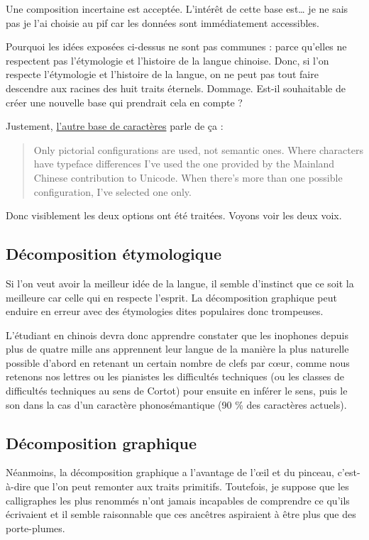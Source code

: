 \documentclass[12pt,onecolumn]{article} %
\begin{document}
Une composition incertaine est acceptée. L'intérêt de cette base est… je ne sais pas je l'ai choisie au pif car les données sont immédiatement accessibles.

Pourquoi les idées exposées ci-dessus ne sont pas communes : parce qu'elles ne respectent pas l'étymologie et l'histoire de la langue chinoise. Donc, si l'on respecte l'étymologie et l'histoire de la langue, on ne peut pas tout faire descendre aux racines des huit traits éternels. Dommage. Est-il souhaitable de créer une nouvelle base qui prendrait cela en compte ?

Justement, \href{http://cjkdecomp.codeplex.com/wikipage?title=cjk-decomp&referringTitle=Home}{l'autre base de caractères} parle de ça : \begin{quotation}Only pictorial configurations are used, not semantic ones. Where characters have typeface differences I've used the one provided by the Mainland Chinese contribution to Unicode. When there's more than one possible configuration, I've selected one only.
\end{quotation}
Donc visiblement les deux options ont été traitées. Voyons voir les deux voix.

\subsection{Décomposition étymologique}

Si l'on veut avoir la meilleur idée de la langue, il semble d'instinct que ce soit la meilleure car celle qui en respecte l'esprit. La décomposition graphique peut enduire en erreur avec des étymologies dites populaires donc trompeuses.

L'étudiant en chinois devra donc apprendre constater que les inophones depuis plus de quatre mille ans apprennent leur langue de la manière la plus naturelle possible d'abord en retenant un certain nombre de clefs par cœur, comme nous retenons nos lettres ou les pianistes les difficultés techniques (ou les classes de difficultés techniques au sens de Cortot) pour ensuite en inférer le sens, puis le son dans la cas d'un caractère phonosémantique (90 \% des caractères actuels).

\subsection{Décomposition graphique}

Néanmoins, la décomposition graphique a l'avantage de l'œil et du pinceau, c'est-à-dire que l'on peut remonter aux traits primitifs. Toutefois, je suppose que les calligraphes les plus renommés n'ont jamais incapables de comprendre ce qu'ils écrivaient et il semble raisonnable que ces ancêtres aspiraient à être plus que des porte-plumes.
\end{document}
